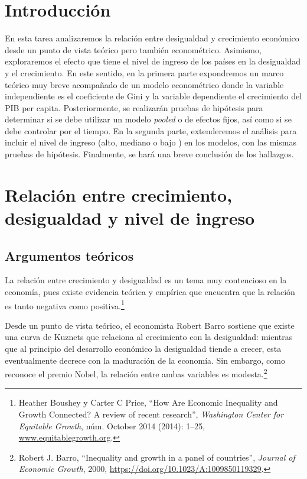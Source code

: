 \documentclass[
  11pt,
]{article}
\begin{document}
\tableofcontents

\newpage

\hypertarget{introducciuxf3n}{%
\section{Introducción}\label{introducciuxf3n}}

En esta tarea analizaremos la relación entre desigualdad y crecimiento
económico desde un punto de vista teórico pero también econométrico.
Asimismo, exploraremos el efecto que tiene el nivel de ingreso de los
países en la desigualdad y el crecimiento. En este sentido, en la
primera parte expondremos un marco teórico muy breve acompañado de un
modelo econométrico donde la variable independiente es el coeficiente de
Gini y la variable dependiente el crecimiento del PIB per capita.
Posteriormente, se realizarán pruebas de hipótesis para determinar si se
debe utilizar un modelo \emph{pooled} o de efectos fijos, así como si se
debe controlar por el tiempo. En la segunda parte, extenderemos el
análisis para incluir el nivel de ingreso (alto, mediano o bajo ) en los
modelos, con las mismas pruebas de hipótesis. Finalmente, se hará una
breve conclusión de los hallazgos.

\hypertarget{relaciuxf3n-entre-crecimiento-desigualdad-y-nivel-de-ingreso}{%
\section{Relación entre crecimiento, desigualdad y nivel de
ingreso}\label{relaciuxf3n-entre-crecimiento-desigualdad-y-nivel-de-ingreso}}

\hypertarget{argumentos-teuxf3ricos}{%
\subsection{Argumentos teóricos}\label{argumentos-teuxf3ricos}}

La relación entre crecimiento y desigualdad es un tema muy contencioso
en la economía, pues existe evidencia teórica y empírica que encuentra
que la relación es tanto negativa como positiva.\footnote{Heather
  Boushey y Carter C Price, {``{How Are Economic Inequality and Growth
  Connected? A review of recent research}''}, \emph{Washington Center
  for Equitable Growth}, núm. October 2014 (2014): 1--25,
  \href{https://www.equitablegrowth.org}{www.equitablegrowth.org}.}

Desde un punto de vista teórico, el economista Robert Barro sostiene que
existe una curva de Kuznets que relaciona al crecimiento con la
desigualdad: mientras que al principio del desarrollo económico la
desigualdad tiende a crecer, esta eventualmente decrece con la
maduración de la economía. Sin embargo, como reconoce el premio Nobel,
la relación entre ambas variables es modesta.\footnote{Robert J. Barro,
  {``{Inequality and growth in a panel of countries}''}, \emph{Journal
  of Economic Growth}, 2000,
  \url{https://doi.org/10.1023/A:1009850119329}.}
\end{document}

